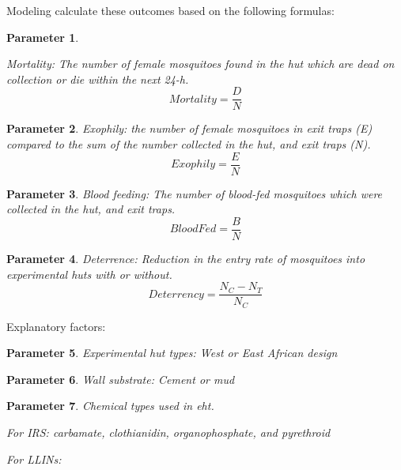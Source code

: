 \documentclass[a4paper, 12pt, twoside]{article}
\newtheorem{parameter}{Parameter}
\begin{document}
Modeling calculate these outcomes based on the following formulas:

\begin{parameter}
	\label{eht:mortality}

	Mortality: The number of female mosquitoes found in the hut which are dead on collection or die within the next 24-h.
    \begin{equation}
		Mortality = \frac{D}{N}
    \end{equation}
\end{parameter}


\begin{parameter}
	\label{eht:exophily}
	Exophily: the number of female mosquitoes in exit traps (E) compared to the sum of the number collected in the hut, and exit traps (N).
    \begin{equation}
		Exophily = \frac{E}{N}
    \end{equation}
\end{parameter}

\begin{parameter}
	\label{eht:blood_fed}
	Blood feeding: The number of blood-fed mosquitoes which were collected in the hut, and exit traps.
  \begin{equation}
		BloodFed = \frac{B}{N}
  \end{equation}
\end{parameter}

\begin{parameter}
	\label{eht:Deterrence}
	Deterrence: Reduction in the entry rate of mosquitoes into experimental huts with or without.
  \begin{equation}
		Deterrency = \frac{N_C - N_T}{N_C}
  \end{equation}
\end{parameter}

Explanatory factors:

\begin{parameter}
	\label{eht:experimental_hut_types}
	Experimental hut types: West or East African design
\end{parameter}

\begin{parameter}
	\label{eht:wall_substrate} Wall substrate: Cement or mud
\end{parameter}

\begin{parameter}
	\label{eht:chemical_class_used}
	Chemical types used in \gls{eht}.

	For IRS: carbamate, clothianidin, organophosphate, and pyrethroid

	For LLINs:

\end{parameter}
\end{document}
